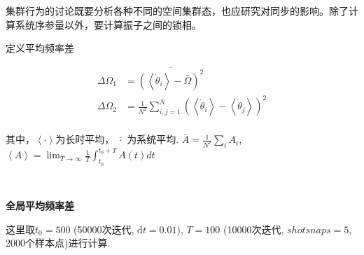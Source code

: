\documentclass{article}
\begin{document}
集群行为的讨论既要分析各种不同的空间集群态，也应研究对同步的影响。除了计算系统序参量以外，要计算振子之间的锁相。

定义平均频率差

$$
\begin{aligned}
	\Delta \Omega _1&=\overline{\left( \left< \dot{\theta}_i \right> -\bar{\Omega} \right) ^2}\\
	\Delta \Omega _2&=\frac{1}{N^2}\sum_{i,j=1}^N{\left( \left< \dot{\theta}_i \right> -\left< \dot{\theta}_j \right> \right) ^2}\\
\end{aligned}
$$

其中，$\left< \cdot \right>$为长时平均，$\overline{\,\,\cdot \,\,}$为系统平均. $\bar{A}=\frac{1}{N^2}\sum\nolimits_i^{}{A_i}$, $\left< A \right> =\lim_{T\rightarrow \infty} \frac{1}{T}\int_{t_0}^{t_0+T}{A\left( t \right) dt}$

$ $

\noindent\textbf{全局平均频率差}

这里取$t_0=500$ (50000次迭代, $\mathrm{d}t=0.01$), $T=100$ (10000次迭代, $shotsnaps=5$, 2000个样本点)进行计算.
\end{document}
